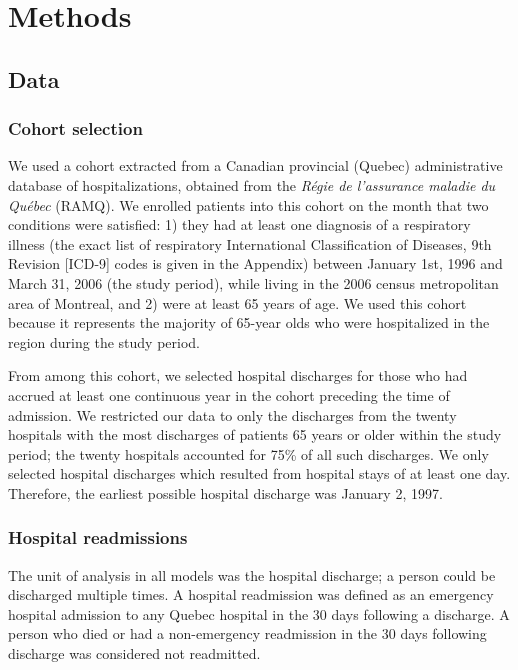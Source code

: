 \documentclass[]{article}\usepackage[]{graphicx}\usepackage[]{color}
\begin{document}
\section{Methods}

\subsection{Data}

\subsubsection{Cohort selection}
We used a cohort extracted from a Canadian provincial (Quebec) administrative database of hospitalizations, obtained from the \emph{Régie de l'assurance maladie du Québec} (RAMQ). We enrolled patients into this cohort on the month that two conditions were satisfied: 1) they had at least one diagnosis of a respiratory illness (the exact list of respiratory International Classification of Diseases, 9th Revision [ICD-9] codes is given in the Appendix) between January 1st, 1996 and March 31, 2006 (the study period), while living in the 2006 census metropolitan area of Montreal, and 2) were at least 65 years of age. We used this cohort because it represents the majority of 65-year olds who were hospitalized in the region during the study period. 

From among this cohort, we selected hospital discharges for those who had accrued at least one continuous year in the cohort preceding the time of admission. We restricted our data to only the discharges from the twenty hospitals with the most discharges of patients 65 years or older within the study period; the twenty hospitals accounted for 75\% of all such discharges.  We only selected hospital discharges which resulted from hospital stays of at least one day. Therefore, the earliest possible hospital discharge was January 2, 1997.

\subsubsection{Hospital readmissions}
The unit of analysis in all models was the hospital discharge; a person could be discharged multiple times. A hospital readmission was defined as an emergency hospital admission to any Quebec hospital in the 30 days following a discharge.  A person who died or had a non-emergency readmission in the 30 days following discharge was considered not readmitted.
\end{document}
